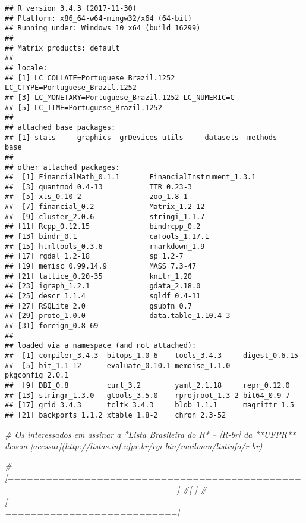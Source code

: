 \documentclass[]{article}
\newenvironment{Shaded}{\begin{snugshade}}{\end{snugshade}}
\newcommand{\CommentTok}[1]{\textcolor[rgb]{0.56,0.35,0.01}{\textit{#1}}}
\begin{document}
\begin{verbatim}
## R version 3.4.3 (2017-11-30)
## Platform: x86_64-w64-mingw32/x64 (64-bit)
## Running under: Windows 10 x64 (build 16299)
## 
## Matrix products: default
## 
## locale:
## [1] LC_COLLATE=Portuguese_Brazil.1252  LC_CTYPE=Portuguese_Brazil.1252   
## [3] LC_MONETARY=Portuguese_Brazil.1252 LC_NUMERIC=C                      
## [5] LC_TIME=Portuguese_Brazil.1252    
## 
## attached base packages:
## [1] stats     graphics  grDevices utils     datasets  methods   base     
## 
## other attached packages:
##  [1] FinancialMath_0.1.1       FinancialInstrument_1.3.1
##  [3] quantmod_0.4-13           TTR_0.23-3               
##  [5] xts_0.10-2                zoo_1.8-1                
##  [7] financial_0.2             Matrix_1.2-12            
##  [9] cluster_2.0.6             stringi_1.1.7            
## [11] Rcpp_0.12.15              bindrcpp_0.2             
## [13] bindr_0.1                 caTools_1.17.1           
## [15] htmltools_0.3.6           rmarkdown_1.9            
## [17] rgdal_1.2-18              sp_1.2-7                 
## [19] memisc_0.99.14.9          MASS_7.3-47              
## [21] lattice_0.20-35           knitr_1.20               
## [23] igraph_1.2.1              gdata_2.18.0             
## [25] descr_1.1.4               sqldf_0.4-11             
## [27] RSQLite_2.0               gsubfn_0.7               
## [29] proto_1.0.0               data.table_1.10.4-3      
## [31] foreign_0.8-69           
## 
## loaded via a namespace (and not attached):
##  [1] compiler_3.4.3  bitops_1.0-6    tools_3.4.3     digest_0.6.15  
##  [5] bit_1.1-12      evaluate_0.10.1 memoise_1.1.0   pkgconfig_2.0.1
##  [9] DBI_0.8         curl_3.2        yaml_2.1.18     repr_0.12.0    
## [13] stringr_1.3.0   gtools_3.5.0    rprojroot_1.3-2 bit64_0.9-7    
## [17] grid_3.4.3      tcltk_3.4.3     blob_1.1.1      magrittr_1.5   
## [21] backports_1.1.2 xtable_1.8-2    chron_2.3-52
\end{verbatim}

\begin{Shaded}
\begin{Highlighting}[]
\CommentTok{# Os interessados em assinar a *Lista Brasileira do R* -- [R-br] da **UFPR** devem [acessar](http://listas.inf.ufpr.br/cgi-bin/mailman/listinfo/r-br)}

\CommentTok{#[=========================================================================]}
\CommentTok{#[                                                                         ]}
\CommentTok{#[=========================================================================]}
\end{Highlighting}
\end{Shaded}
\end{document}

